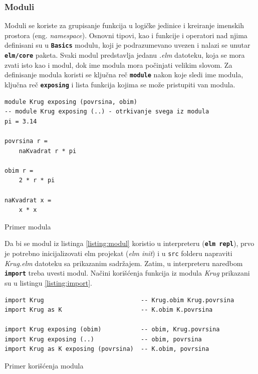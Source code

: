 \documentclass[12pt,oneside]{memoir}
\begin{document}
\subsubsection{Moduli}
Moduli se koriste za grupisanje funkcija u logičke jedinice i kreiranje imenskih 
prostora (eng. \emph{namespace}). Osnovni tipovi, kao i funkcije i operatori nad njima 
definisani su u \texttt{\textbf{Basics}} modulu, koji je podrazumevano uvezen i nalazi se 
unutar \texttt{\textbf{elm/core}} paketa. Svaki modul predstavlja jedanu \emph{.elm} datoteku,
koja se mora zvati isto kao i modul, dok ime modula mora počinjati velikim slovom.
Za definisanje modula koristi se ključna reč \texttt{\textbf{module}} nakon koje sledi
ime modula, ključna reč \texttt{\textbf{exposing}} i lista funkcija kojima se može 
pristupiti van modula.
\begin{listing}[h]
\begin{verbatim}
module Krug exposing (povrsina, obim) 
-- module Krug exposing (..) - otrkivanje svega iz modula 
pi = 3.14

povrsina r =
    naKvadrat r * pi

obim r =
    2 * r * pi

naKvadrat x =
    x * x
\end{verbatim}
\caption{Primer modula}
\label{listing:modul}
\end{listing}

Da bi se modul iz listinga \ref{listing:modul} koristio u interpreteru (\texttt{\textbf{elm repl}}),
prvo je potrebno inicijalizovati elm projekat (\emph{elm init}) i u \texttt{src} folderu napraviti 
\emph{Krug.elm} datoteku sa prikazanim sadržajem. Zatim, u interpreteru naredbom 
\texttt{\textbf{import}} treba uvesti modul. Načini korišćenja funkcija iz modula
\emph{Krug} prikazani su u listingu \ref{listing:import}.
\begin{listing}[h]
\begin{verbatim}
import Krug                           -- Krug.obim Krug.povrsina
import Krug as K                      -- K.obim K.povrsina

import Krug exposing (obim)           -- obim, Krug.povrsina
import Krug exposing (..)             -- obim, povrsina
import Krug as K exposing (povrsina)  -- K.obim, povrsina
\end{verbatim}
\caption{Primer korišćenja modula}
\label{listing:import}
\end{listing}
\end{document}
